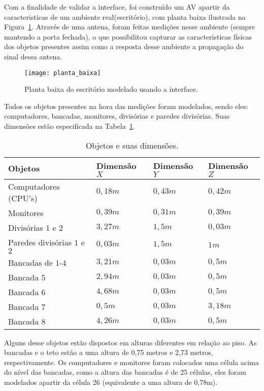 Com a finalidade de validar a interface, foi construído um AV apartir da caracteristicas de um ambiente real(escritório), com planta baixa ilustrada na Figura~\ref{fg:planta_baixa}. Através de uma antena, foram feitas medições nesse ambiente (sempre mantendo a porta fechada), o que possibilitou capturar as caracteristicas físicas dos objetos presentes assim como a resposta desse ambiente a propagação do sinal dessa antena.\\

\begin{figure}[ht!]
	\centering
	\texttt{[image: planta\_baixa]}
	\caption{Planta baixa do escritório modelado usando a interface.}
	\label{fg:planta_baixa}
\end{figure}

Todos os objetos presentes na hora das medições foram modelados, sendo eles: computadores, bancadas, monitores, divisórias e paredes divisórias. Suas dimensões estão especificada na Tabela~\ref{tb:objetos}.

\begin{table}
\centering
	\begin{tabular}{|l|l|l|l|}
	\hline
	\textbf{Objetos} & \textbf{Dimensão $X$} & \textbf{Dimensão} $Y$ & \textbf{Dimensão $Z$}\\ \hline
	Computadores (CPU's) & $0,18m$ & $0,43m$ & $0,42m$ \\ \hline
	Monitores & $0,39m$ & $0,31m$ & $0,39m$ \\ \hline
	Divisórias $1$ e $2$ & $3,27m$ & $1,5m$ & $0,03m$ \\ \hline
	Paredes divisórias $1$ e $2$ & $0,03m$ & $1,5m$ & $1m$ \\ \hline
	Bancadas de $1$-$4$ & $3,21m$ & $0,03m$ & $0,5m$ \\ \hline
	Bancada $5$ & $2,94m$ & $0,03m$ & $0,5m$ \\ \hline
	Bancada $6$ & $4,68m$ & $0,03m$ & $0,5m$ \\ \hline
	Bancada $7$ & $0,5m$ & $0,03m$ & $3,18m$ \\ \hline
	Bancada $8$ & $4,26m$ & $0,03m$ & $0,5m$ \\
	\hline
	\end{tabular}
	\caption{Objetos e suas dimensões.}
	\label{tb:objetos}
\end{table}

Alguns desse objetos estão dispostos em alturas diferentes em relação ao piso. As bancadas e o teto estão a uma altura de 0,75 metros e 2,73 metros, respectivamente. Os computadores e monitores foram colocados uma célula acima do nível das bancadas, como a altura das bancadas é de 25 células, eles foram modelados apartir da célula 26 (equivalente a uma altura de 0,78m).\\


